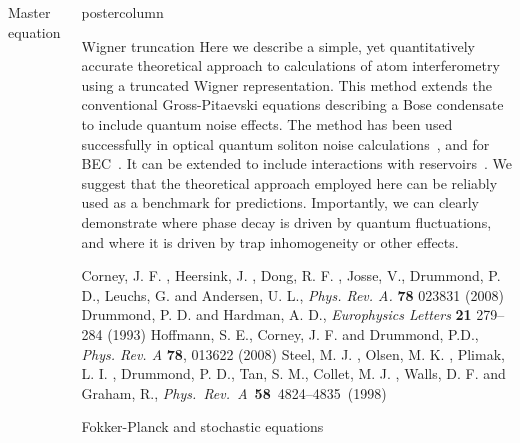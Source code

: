 \documentclass[final,hyperref={pdfpagelabels=false}]{beamer}
\newcommand{\mycolumn}[1]{
	\begin{column}{.5\textwidth}
	\begin{beamercolorbox}[center,wd=\textwidth]{postercolumn}
	\begin{minipage}[T]{.95\textwidth} %

	\parbox[t][\columnheight]{\textwidth}{ #1 }

	\end{minipage}
	\end{beamercolorbox}
	\end{column}
}
\newlength{\columnheight}
\begin{document}
\begin{frame}
\begin{columns}
{\begin{block}{Master equation}
\end{block}

} %

\mycolumn{

\begin{block}{Wigner truncation}
\color{textblock}
Here we describe a simple, yet quantitatively accurate theoretical approach to calculations of atom interferometry
using a truncated Wigner representation.
This method extends the conventional Gross-Pitaevski equations describing a Bose condensate to include quantum noise effects.
The method has been used successfully in optical quantum soliton noise calculations~\cite{Corney, Drummond},
and for BEC~\cite{Steel}.
It can be extended to include interactions with reservoirs~\cite{Hoffmann}.
We suggest that the theoretical approach employed here can be reliably used as a benchmark for predictions.
Importantly, we can clearly demonstrate where phase decay is driven by quantum fluctuations,
and where it is driven by trap inhomogeneity or other effects.

\tiny{ \begin{thebibliography}{9}
	\bibitem{Corney} Corney, J. F. , Heersink, J. , Dong, R. F. , Josse, V., Drummond, P. D., Leuchs, G.
		and Andersen, U. L., \textit{Phys. Rev. A.} \textbf{78} 023831 (2008)
	\bibitem{Drummond} Drummond, P. D. and Hardman, A. D., \textit{Europhysics Letters} \textbf{21} 279--284 (1993)
	\bibitem{Hoffmann} Hoffmann, S. E.,  Corney, J. F. and Drummond, P.D., \textit{Phys. Rev. A} \textbf{78}, 013622 (2008)
	\bibitem{Steel} Steel, M. J. , Olsen, M. K. ,  Plimak, L. I. , Drummond, P. D., Tan, S. M., Collet, M. J. , Walls, D. F. and Graham, R., \textit{Phys.~Rev.~A}~\textbf{58}~4824--4835~(1998)
\end{thebibliography} }

\end{block}
            
\begin{block}{Fokker-Planck and stochastic equations}


\end{block}}
\end{columns}
\end{frame}
\end{document}
